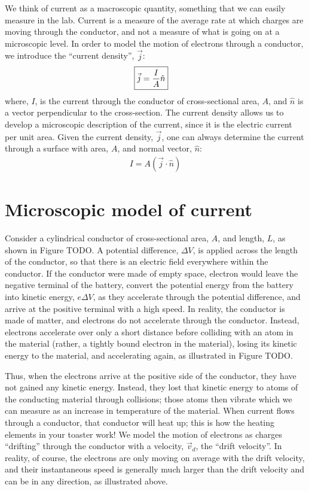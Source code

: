 We think of current as a macroscopic quantity, something that we can easily measure in the lab. Current is a measure of the average rate at which charges are moving through the conductor, and not a measure of what is going on at a microscopic level. In order to model the motion of electrons through a conductor, we introduce the ``current density'', $\vec j$:
\begin{align*}
\Aboxed{\vec j = \frac{I}{A}\hat n}
\end{align*}
where, $I$, is the current through the conductor of cross-sectional area, $A$, and $\hat n$ is a vector perpendicular to the cross-section.  The current density allows us to develop a microscopic description of the current, since it is the electric current per unit area. Given the current density, $\vec j$, one can always determine the current through a surface with area, $A$, and normal vector, $\hat n$:
\begin{align*}
I = A(\vec j\cdot \hat n)
\end{align*}

\section{Microscopic model of current}
\label{sec:current:micromodel}
Consider a cylindrical conductor of cross-sectional area, $A$, and length, $L$, as shown in Figure TODO. A potential difference, $\Delta V$, is applied across the length of the conductor, so that there is an electric field everywhere within the conductor. If the conductor were made of empty space, electron would leave the negative terminal of the battery, convert the potential energy from the battery into kinetic energy, $e\Delta V$, as they accelerate through the potential difference, and arrive at the positive terminal with a high speed. In reality, the conductor is made of matter, and electrons do not accelerate through the conductor. Instead, electrons accelerate over only a short distance before colliding with an atom in the material (rather, a tightly bound electron in the material), losing its kinetic energy to the material, and accelerating again, as illustrated in Figure TODO.

Thus, when the electrons arrive at the positive side of the conductor, they have not gained any kinetic energy. Instead, they lost that kinetic energy to atoms of the conducting material through collisions; those atoms then vibrate which we can measure as an increase in temperature of the material. When current flows through a conductor, that conductor will heat up; this is how the heating elements in your toaster work!
We model the motion of electrons as charges ``drifting'' through the conductor with a velocity, $\vec v_d$, the ``drift velocity''. In reality, of course, the electrons are only moving on average with the drift velocity, and their instantaneous speed is generally much larger than the drift velocity and can be in any direction, as illustrated above. 

